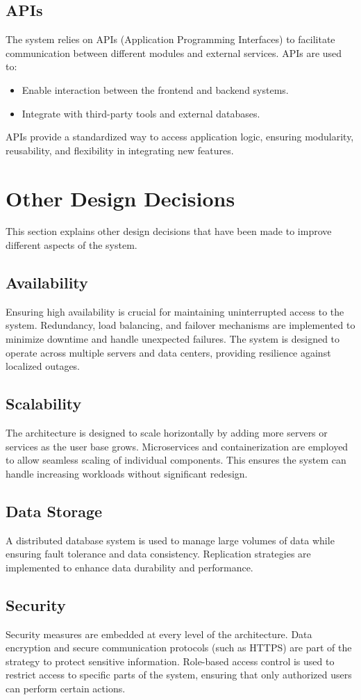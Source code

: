 \subsection{APIs}
The system relies on APIs (Application Programming Interfaces) to facilitate communication between different modules and external services. APIs are used to:
\begin{itemize}
    \item Enable interaction between the frontend and backend systems.
    \item Integrate with third-party tools and external databases.
\end{itemize}
APIs provide a standardized way to access application logic, ensuring modularity, reusability, and flexibility in integrating new features.

\section{Other Design Decisions}
\label{sec:other_design_decisions}%
This section explains other design decisions that have been made to improve different aspects of the system.

\subsection{Availability}
Ensuring high availability is crucial for maintaining uninterrupted access to the system. Redundancy, load balancing, and failover mechanisms are implemented to minimize downtime and handle unexpected failures. The system is designed to operate across multiple servers and data centers, providing resilience against localized outages.

\subsection{Scalability}
The architecture is designed to scale horizontally by adding more servers or services as the user base grows. Microservices and containerization are employed to allow seamless scaling of individual components. This ensures the system can handle increasing workloads without significant redesign.

\subsection{Data Storage}
A distributed database system is used to manage large volumes of data while ensuring fault tolerance and data consistency. Replication strategies are implemented to enhance data durability and performance.

\subsection{Security}
Security measures are embedded at every level of the architecture. Data encryption and secure communication protocols (such as HTTPS) are part of the strategy to protect sensitive information. Role-based access control is used to restrict access to specific parts of the system, ensuring that only authorized users can perform certain actions.